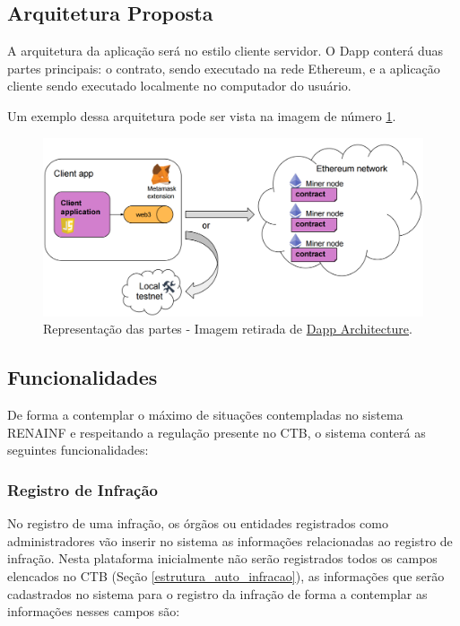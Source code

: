 \subsection{Arquitetura Proposta}

A arquitetura da aplicação será no estilo cliente servidor. O Dapp conterá duas partes principais: o contrato, sendo executado na rede Ethereum, e a aplicação cliente sendo executado localmente no computador do usuário.

Um exemplo dessa arquitetura pode ser vista na imagem de número \ref{fig:dapp_representacao}.

    \begin{figure}[h]
         \centering
         \includegraphics[scale=0.25]{figuras/capitulo_3/dapp_representacao_comunicacao.png}
         \caption{Representação das partes - Imagem retirada de \href{https://sites.google.com/site/blockchaintutorial/dapp-architecture}{Dapp Architecture}.}
         \label{fig:dapp_representacao}
    \end{figure}



\subsection{Funcionalidades}
\label{section:funcionalidades_propostas}

De forma a contemplar o máximo de situações contempladas no sistema RENAINF e respeitando a regulação presente no CTB, o sistema conterá as seguintes funcionalidades:


    \subsubsection{Registro de Infração}
    
        No registro de uma infração, os órgãos ou entidades registrados como administradores vão inserir no sistema as informações relacionadas ao registro de infração. Nesta plataforma inicialmente não serão registrados todos os campos elencados no CTB (Seção \ref{estrutura_auto_infracao}), as informações que serão cadastrados no sistema para o registro da infração de forma a contemplar as informações nesses campos são:
        
